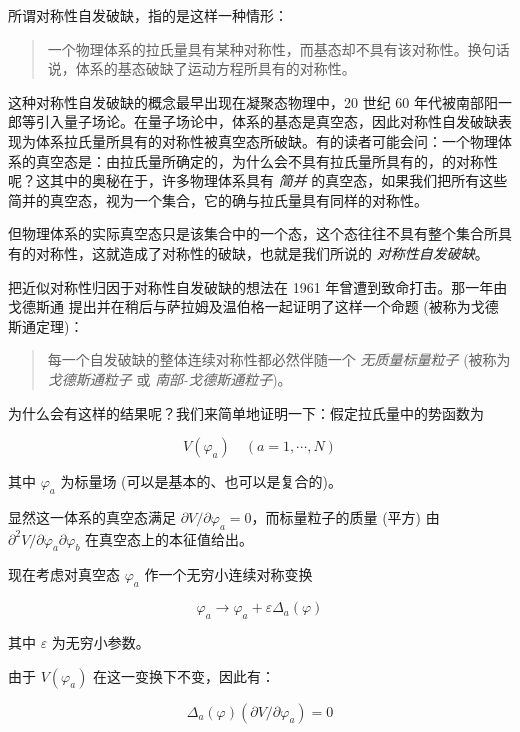 所谓对称性自发破缺，指的是这样一种情形：

\begin{quote}
    一个物理体系的拉氏量具有某种对称性，而基态却不具有该对称性。换句话说，体系的基态破缺了运动方程所具有的对称性。
\end{quote}

这种对称性自发破缺的概念最早出现在凝聚态物理中，20 世纪 60 年代被南部阳一郎等引入量子场论。在量子场论中，体系的基态是真空态，因此对称性自发破缺表现为体系拉氏量所具有的对称性被真空态所破缺。有的读者可能会问：一个物理体系的真空态是：由拉氏量所确定的，为什么会不具有拉氏量所具有的，的对称性呢？这其中的奥秘在于，许多物理体系具有 \emph{简并} 的真空态，如果我们把所有这些简并的真空态，视为一个集合，它的确与拉氏量具有同样的对称性。

但物理体系的实际真空态只是该集合中的一个态，这个态往往不具有整个集合所具有的对称性，这就造成了对称性的破缺，也就是我们所说的 \emph{对称性自发破缺}。

把近似对称性归因于对称性自发破缺的想法在 1961 年曾遭到致命打击。那一年由戈德斯通
提出并在稍后与萨拉姆及温伯格一起证明了这样一个命题 (被称为戈德斯通定理)：

\begin{quote}
    每一个自发破缺的整体连续对称性都必然伴随一个 \emph{无质量标量粒子} (被称为 \emph{戈德斯通粒子} 或 \emph{南部-戈德斯通粒子})。
\end{quote}

为什么会有这样的结果呢？我们来简单地证明一下：假定拉氏量中的势函数为

\begin{equation}
    V(\varphi_a) \quad (a=1, \cdots, N)
\end{equation}

\noindent 其中 $\varphi_a$ 为标量场 (可以是基本的、也可以是复合的)。

显然这一体系的真空态满足 $\partial V/\partial \varphi_a=0$，而标量粒子的质量 (平方) 由 $\partial^2 V/\partial \varphi_a \partial \varphi_b$ 在真空态上的本征值给出。

现在考虑对真空态 $\varphi_a$ 作一个无穷小连续对称变换

\begin{equation}
    \varphi_a \to \varphi_a + \varepsilon \Delta_a(\varphi)
\end{equation}

\noindent 其中 $\varepsilon$ 为无穷小参数。

由于 $V(\varphi_a)$ 在这一变换下不变，因此有：

\begin{equation}
    \Delta_a(\varphi) (\partial V/\partial \varphi_a)=0
\end{equation}

